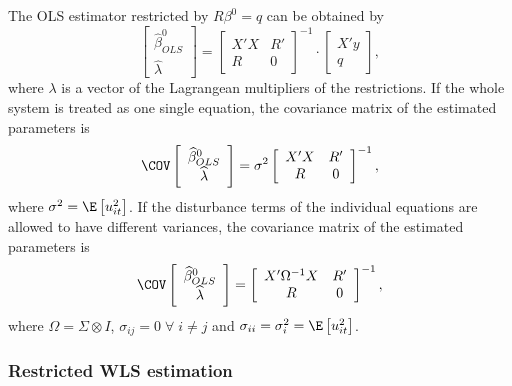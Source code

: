 The OLS estimator restricted by $R \beta^0 = q$ can be obtained by
\begin{equation}
   \left[ \begin{array}{c}
      \widehat{\beta}^0_{OLS} \\ \widehat{\lambda}
   \end{array} \right]
   =
   \left[ \begin{array}{cc}
      X' X & R' \\ 
      R & 0
   \end{array} \right]^{-1}
   \cdot
   \left[ \begin{array}{c}
      X' y \\ q 
   \end{array} \right] ,
\end{equation}
where $\lambda$ is a vector of the Lagrangean multipliers of the restrictions.
If the whole system is treated as one single equation,
the covariance matrix of the estimated parameters is
\begin{equation}
   \COV
   \left[ \begin{array}{c}
      \widehat{\beta}^0_{OLS} \\ \widehat{\lambda}
   \end{array} \right] 
   = \sigma^2 
   \left[ \begin{array}{cc}
      X' X & R' \\ 
      R & 0
   \end{array} \right]^{-1} ,
\end{equation}
where $\sigma^2 = \E \left[ u_{it}^2 \right]$.
If the disturbance terms of the individual equations
are allowed to have different variances, 
the covariance matrix of the estimated parameters is
\begin{equation}
   \COV
   \left[ \begin{array}{c}
      \widehat{\beta}^0_{OLS} \\ \widehat{\lambda}
   \end{array} \right] 
   = 
   \left[ \begin{array}{cc}
      X' \Omega^{-1} X & R' \\ 
      R & 0
   \end{array} \right]^{-1} ,
\end{equation}
where $\Omega = \Sigma \otimes I$,
$\sigma_{ij} = 0 \; \forall \; i \neq j$ and
$\sigma_{ii} = \sigma_i^2 = \E \left[ u_{it}^2 \right]$.

\subsubsection{Restricted WLS estimation}

